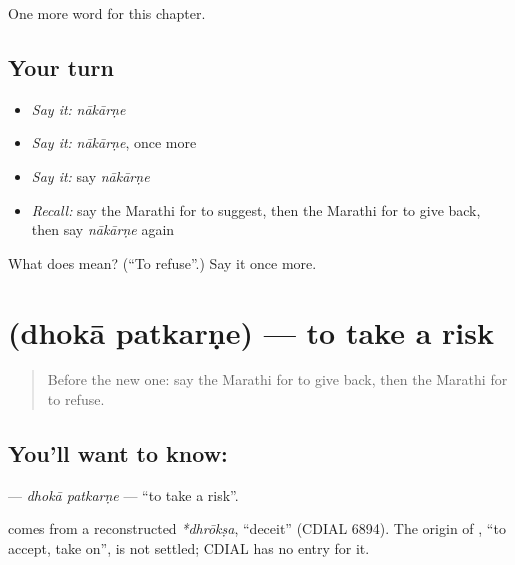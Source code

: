 \begin{grammarlens}[title={What you've built}]
One more word for this chapter.
\end{grammarlens}

\subsection*{Your turn}
\begin{itemize}
\raggedright
  \item \emph{Say it:} \emph{nākārṇe}
  \item \emph{Say it:} \emph{nākārṇe}, once more
  \item \emph{Say it:} say \emph{nākārṇe}
  \item \emph{Recall:} say the Marathi for to suggest, then the Marathi for to give back, then say \emph{nākārṇe} again
\end{itemize}

\begin{tcolorbox}[breakable,colback=teal!4,colframe=teal!35!black,title={Before you move on}]
What does  mean? (\textquotedblleft{}To refuse\textquotedblright{}.) Say it once more.
\end{tcolorbox}
\section[\texorpdfstring{\mr{धोका} \mr{पत्करणे} (dhokā patkarṇe)}{धोका पत्करणे (dhokā patkarṇe)}]{  (dhokā patkarṇe) — to take a risk}

\label{lesson:MR-C226-dhoka-patkarne}



\begin{quote}
Before the new one: say the Marathi for to give back, then the Marathi for to refuse.
\end{quote}

\subsection*{You'll want to know:  }
\textbf{ } — \emph{dhokā patkarṇe} — \textquotedblleft{}to take a risk\textquotedblright{}.

\begin{cousinweb}
\textbf{} comes from a reconstructed \emph{*dhrōkṣa}, \textquotedblleft{}deceit\textquotedblright{} (CDIAL 6894). The origin of \textbf{}, \textquotedblleft{}to accept, take on\textquotedblright{}, is not settled; CDIAL has no entry for it.
\end{cousinweb}

